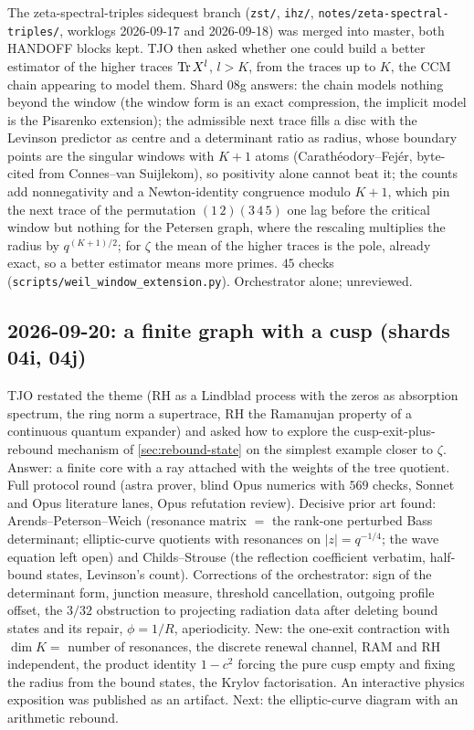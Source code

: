 The zeta-spectral-triples sidequest branch (\texttt{zst/}, \texttt{ihz/},
\texttt{notes/zeta-spectral-triples/}, worklogs 2026-09-17 and 2026-09-18) was merged into
master, both HANDOFF blocks kept. TJO then asked whether one could build a better estimator of the
higher traces $\operatorname{Tr} X^l$, $l > K$, from the traces up to $K$, the CCM chain appearing to model them.
Shard 08g answers: the chain models nothing beyond the window (the window form is an exact
compression, the implicit model is the Pisarenko extension); the admissible next trace fills a
disc with the Levinson predictor as centre and a determinant ratio as radius, whose boundary
points are the singular windows with $K+1$ atoms (Carath\'eodory--Fej\'er, byte-cited from
Connes--van Suijlekom), so positivity alone cannot beat it; the counts add nonnegativity and a
Newton-identity congruence modulo $K+1$, which pin the next trace of the permutation
$(1\,2)(3\,4\,5)$ one lag before the critical window but nothing for the Petersen graph, where the
rescaling multiplies the radius by $q^{(K+1)/2}$; for $\zeta$ the mean of the higher traces is the
pole, already exact, so a better estimator means more primes. $45$ checks
(\texttt{scripts/weil\_window\_extension.py}). Orchestrator alone; unreviewed.

\subsection*{2026-09-20: a finite graph with a cusp (shards 04i, 04j)}
TJO restated the theme (RH as a Lindblad process with the zeros as absorption spectrum, the ring norm
a supertrace, RH the Ramanujan property of a continuous quantum expander) and asked how to explore
the cusp-exit-plus-rebound mechanism of \cref{sec:rebound-state} on the simplest example closer to
$\zeta$. Answer: a finite core with a ray attached with the weights of the tree quotient. Full protocol
round (astra prover, blind Opus numerics with $569$ checks, Sonnet and Opus literature lanes, Opus
refutation review). Decisive prior art found: Arends--Peterson--Weich (resonance matrix $=$ the
rank-one perturbed Bass determinant; elliptic-curve quotients with resonances on $|z| = q^{-1/4}$; the
wave equation left open) and Childs--Strouse (the reflection coefficient verbatim, half-bound states,
Levinson's count). Corrections of the orchestrator: sign of the determinant form, junction measure,
threshold cancellation, outgoing profile offset, the $3/32$ obstruction to projecting radiation data
after deleting bound states and its repair, $\phi = 1/R$, aperiodicity. New: the one-exit contraction
with $\dim K = $ number of resonances, the discrete renewal channel, RAM and RH independent, the
product identity $1-c^2$ forcing the pure cusp empty and fixing the radius from the bound states, the
Krylov factorisation. An interactive physics exposition was published as an artifact. Next: the
elliptic-curve diagram with an arithmetic rebound.
